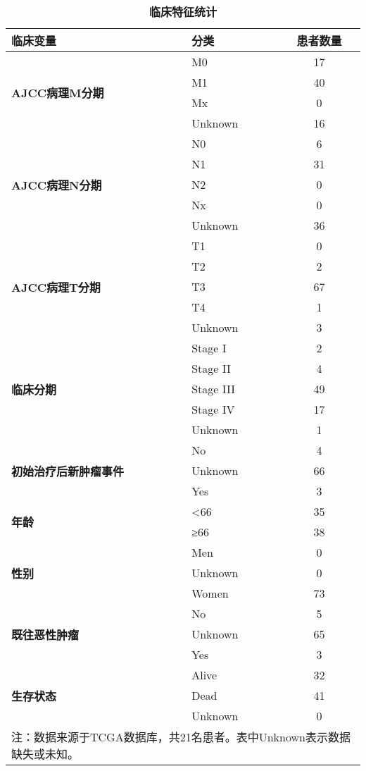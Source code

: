 \begin{table}[htbp]
\centering
\caption{{\bfseries 临床特征统计}}
\label{tab:clinical_stats_nature}
\begin{tabular}{p{4cm}p{3cm}c}
\toprule
\textbf{临床变量} & \textbf{分类} & \textbf{患者数量} \\
\midrule
\multirow{4}{*}{\textbf{AJCC病理M分期}} & M0 & 17 \\
 & M1 & 40 \\
 & Mx & 0 \\
 & Unknown & 16 \\
\midrule
\multirow{5}{*}{\textbf{AJCC病理N分期}} & N0 & 6 \\
 & N1 & 31 \\
 & N2 & 0 \\
 & Nx & 0 \\
 & Unknown & 36 \\
\midrule
\multirow{5}{*}{\textbf{AJCC病理T分期}} & T1 & 0 \\
 & T2 & 2 \\
 & T3 & 67 \\
 & T4 & 1 \\
 & Unknown & 3 \\
\midrule
\multirow{5}{*}{\textbf{临床分期}} & Stage I & 2 \\
 & Stage II & 4 \\
 & Stage III & 49 \\
 & Stage IV & 17 \\
 & Unknown & 1 \\
\midrule
\multirow{3}{*}{\textbf{初始治疗后新肿瘤事件}} & No & 4 \\
 & Unknown & 66 \\
 & Yes & 3 \\
\midrule
\multirow{2}{*}{\textbf{年龄}} & <66 & 35 \\
 & ≥66 & 38 \\
\midrule
\multirow{3}{*}{\textbf{性别}} & Men & 0 \\
 & Unknown & 0 \\
 & Women & 73 \\
\midrule
\multirow{3}{*}{\textbf{既往恶性肿瘤}} & No & 5 \\
 & Unknown & 65 \\
 & Yes & 3 \\
\midrule
\multirow{3}{*}{\textbf{生存状态}} & Alive & 32 \\
 & Dead & 41 \\
 & Unknown & 0 \\
\bottomrule
\multicolumn{3}{p{10cm}}{\small 注：数据来源于TCGA数据库，共21名患者。表中Unknown表示数据缺失或未知。}\
\end{tabular}
\end{table}